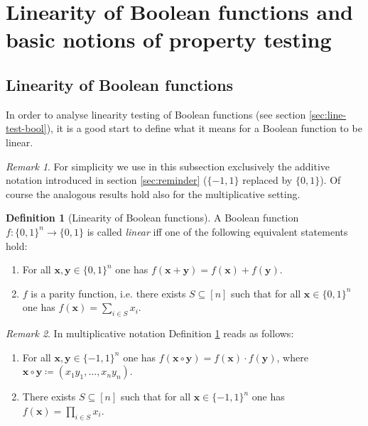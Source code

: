 \documentclass[a4paper]{article}
\newcommand{\nset}{[n]}
\newcommand{\boldx}{\boldsymbol{x}}
\newcommand{\boldy}{\boldsymbol{y}}
\theoremstyle{plain}
\theoremstyle{definition}
\newtheorem{definition}{Definition}
\theoremstyle{remark}
\newtheorem*{remark*}{Remark}
\begin{document}
\section{Linearity of Boolean functions and basic notions of property testing}
\label{sec:line-bool-funct}

\subsection{Linearity of Boolean functions}
\label{sec:line-bool-funct-1}

In order to analyse linearity testing of Boolean functions (see
section \ref{sec:line-test-bool}), it is a
good start to define what it means for a Boolean
function to be linear. \\ 

\begin{remark*}
For simplicity we use in this subsection exclusively the additive
notation introduced in section \ref{sec:reminder} (\(\{-1,1\}\)
replaced by \(\{0,1\}\)). Of course the
analogous results hold also for the multiplicative setting.  
\end{remark*}

\begin{definition}[Linearity of Boolean functions] \label{def:1}
  A Boolean function \(f: \{0,1\}^n \rightarrow \{0,1\}\) is called \emph{linear}
  iff one of the following equivalent statements hold: 
  \begin{enumerate}[label= (\roman*)]
  \item For all \(\boldx,\boldy \in \{0,1\}^n\) one has
    \(f(\boldx+\boldy) = f(\boldx) + f(\boldy)\). 
  \item \(f\) is a parity function, i.e. there exists \(S \subseteq
    \nset\) such that for all \(\boldx \in \{0,1\}^n\) one has \(f(\boldx) =
    \sum_{i \in S}x_i\). 
  \end{enumerate}
\end{definition}

\begin{remark*}
  \noindent In multiplicative notation Definition \ref{def:1} reads as
  follows:
  \begin{enumerate}[label= (\roman*)]
  \item For all \(\boldx,\boldy \in \{-1,1\}^n\) one has
    \(f(\boldx\circ \boldy) = f(\boldx)\cdot f(\boldy)\), where
    \(\boldx\circ \boldy \coloneqq (x_1y_1, \dots, x_ny_n)\).
  \item There exists \(S \subseteq \nset\) such that for all
    \(\boldx\in \{-1,1\}^n\) one has \(f(\boldx) = \prod_{i\in S}
    x_i\).
  \end{enumerate}
\end{remark*}
\end{document}
